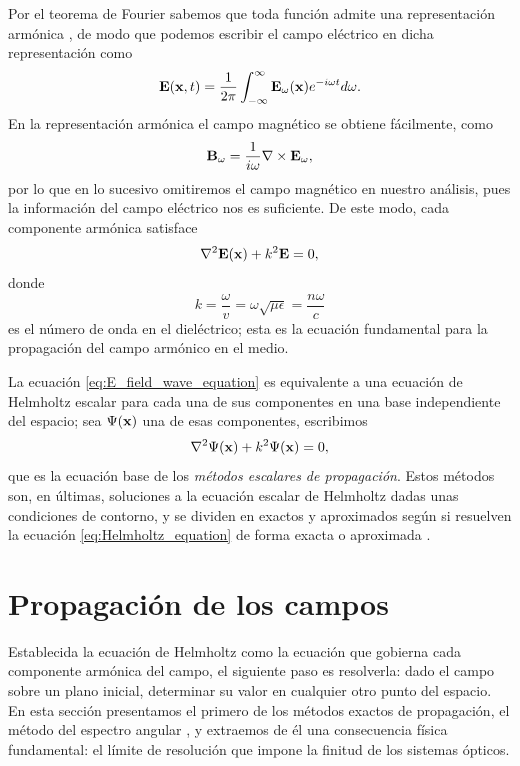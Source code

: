 Por el teorema de Fourier sabemos que toda función admite una representación armónica \cite{arfken2013}, de modo que podemos escribir el campo eléctrico en dicha representación como
\begin{equation}
    \vb{E}(\vb x, t) = \frac{1}{2\pi}\int_{-\infty}^{\infty} \vb{E}_\omega(\vb x) e^{-i\omega t} d\omega.
    \label{eq:E_field_harmonic_representation}
\end{equation}
En la representación armónica el campo magnético se obtiene fácilmente, como
\begin{equation}
    \vb{B}_\omega = \frac{1}{i\omega} \nabla \times \vb{E}_\omega,
    \label{eq:B_harmonic_func_of_E_harmonic}
\end{equation}
por lo que en lo sucesivo omitiremos el campo magnético en nuestro análisis, pues la información del campo eléctrico nos es suficiente. De este modo, cada componente armónica satisface
\begin{equation}
    \nabla^2 \vb{E}(\vb x) + k^2 \vb E = 0,
    \label{eq:E_field_wave_equation}
\end{equation}
donde
\[
k = \frac{\omega}{v} = \omega\sqrt{\mu\epsilon} = \frac{n\omega}{c}
\]
es el número de onda en el dieléctrico; esta es la ecuación fundamental para la propagación del campo armónico en el medio.

La ecuación \eqref{eq:E_field_wave_equation} es equivalente a una ecuación de Helmholtz escalar para cada una de sus componentes en una base independiente del espacio; sea $\Psi(\vb x)$ una de esas componentes, escribimos
\begin{equation}
    \nabla^2 \Psi (\vb x) + k^2 \Psi (\vb x) = 0,
    \label{eq:Helmholtz_equation}
\end{equation}
que es la ecuación base de los \textit{métodos escalares de propagación}. Estos métodos son, en últimas, soluciones a la ecuación escalar de Helmholtz dadas unas condiciones de contorno, y se dividen en exactos y aproximados según si resuelven la ecuación \eqref{eq:Helmholtz_equation} de forma exacta o aproximada \cite{goodman2005}.


\section{Propagación de los campos}

Establecida la ecuación de Helmholtz como la ecuación que gobierna cada componente armónica del campo, el siguiente paso es resolverla: dado el campo sobre un plano inicial, determinar su valor en cualquier otro punto del espacio. En esta sección presentamos el primero de los métodos exactos de propagación, el método del espectro angular \cite{goodman2005}, y extraemos de él una consecuencia física fundamental: el límite de resolución que impone la finitud de los sistemas ópticos.

